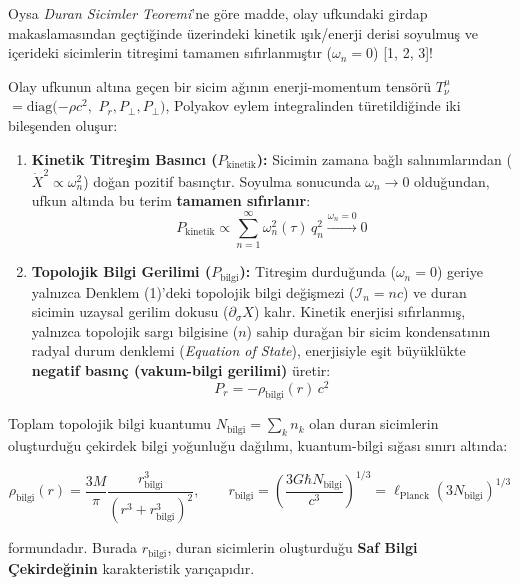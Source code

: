 \documentclass[12pt,a4paper]{article}
\begin{document}
Oysa \textit{Duran Sicimler Teoremi}'ne göre madde, olay ufkundaki girdap makaslamasından geçtiğinde üzerindeki kinetik ışık/enerji derisi soyulmuş ve içerideki sicimlerin titreşimi tamamen sıfırlanmıştır ($\omega_n = 0$) [1, 2, 3]!

Olay ufkunun altına geçen bir sicim ağının enerji-momentum tensörü $T^\mu_\nu$ $= \text{diag}(-\rho c^2,$ $P_r, P_\perp, P_\perp)$, Polyakov eylem integralinden türetildiğinde iki bileşenden oluşur:
\begin{enumerate}
    \item \textbf{Kinetik Titreşim Basıncı ($P_{\text{kinetik}}$):} Sicimin zamana bağlı salınımlarından ($\dot{X}^2 \propto \omega_n^2$) doğan pozitif basınçtır. Soyulma sonucunda $\omega_n \to 0$ olduğundan, ufkun altında bu terim \textbf{tamamen sıfırlanır}:
    \begin{equation}
    P_{\text{kinetik}} \propto \sum_{n=1}^{\infty} \omega_n^2(\tau) \, q_n^2 \xrightarrow{\omega_n = 0} 0
    \end{equation}
    \item \textbf{Topolojik Bilgi Gerilimi ($P_{\text{bilgi}}$):} Titreşim durduğunda ($\omega_n = 0$) geriye yalnızca Denklem (1)'deki topolojik bilgi değişmezi ($\mathcal{I}_n = n c$) ve duran sicimin uzaysal gerilim dokusu ($\partial_\sigma X$) kalır. Kinetik enerjisi sıfırlanmış, yalnızca topolojik sargı bilgisine ($n$) sahip durağan bir sicim kondensatının radyal durum denklemi (\textit{Equation of State}), enerjisiyle eşit büyüklükte \textbf{negatif basınç (vakum-bilgi gerilimi)} üretir:
    \begin{equation}
    P_r = -\rho_{\text{bilgi}}(r) \, c^2
    \end{equation}
\end{enumerate}

Toplam topolojik bilgi kuantumu $N_{\text{bilgi}} = \sum_{k} n_k$ olan duran sicimlerin oluşturduğu çekirdek bilgi yoğunluğu dağılımı, kuantum-bilgi sığası sınırı altında:

\begin{equation}
\rho_{\text{bilgi}}(r) = \frac{3 M}{\pi} \frac{r_{\text{bilgi}}^3}{\left( r^3 + r_{\text{bilgi}}^3 \right)^2}, \qquad r_{\text{bilgi}} = \left( \frac{3 G \hbar N_{\text{bilgi}}}{c^3} \right)^{1/3} = \ell_{\text{Planck}} \left( 3 N_{\text{bilgi}} \right)^{1/3}
\end{equation}

formundadır. Burada $r_{\text{bilgi}}$, duran sicimlerin oluşturduğu \textbf{Saf Bilgi Çekirdeğinin} karakteristik yarıçapıdır.
\end{document}
